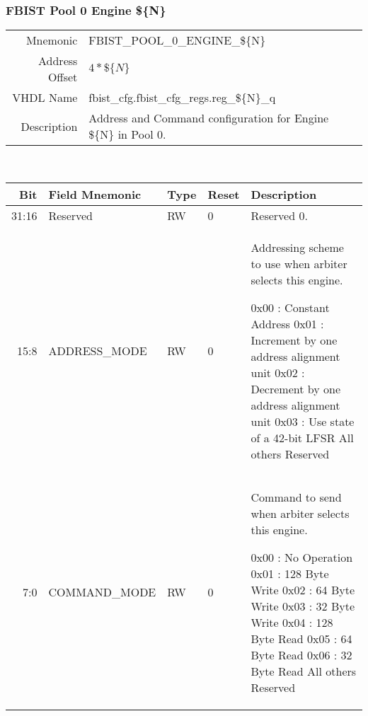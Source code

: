\subsubsection{FBIST Pool 0 Engine \$\{N\}}
\begin{tabular}{ r | p{350px} }
  Mnemonic       & FBIST\_POOL\_0\_ENGINE\_\$\{N\}             \\
  Address Offset & $4 * \$\{N\}$                               \\
  VHDL Name      & fbist\_cfg.fbist\_cfg\_regs.reg\_\$\{N\}\_q \\ \hline

  Description &
  Address and Command configuration for Engine \$\{N\} in Pool 0. \\
\end{tabular}
\\
\begin{tabularx}{\textwidth}{r|l|l|l|X}
  \hline
  Bit   & Field Mnemonic & Type & Reset & Description \\ \hline

  31:16 & Reserved       & RW   & 0     &

  Reserved 0. \\

  15:8  & ADDRESS\_MODE  & RW   & 0     &

  Addressing scheme to use when arbiter selects this engine.

  \setlength\parindent{24pt}
  \indent 0x00 : Constant Address                        \newline
  \indent 0x01 : Increment by one address alignment unit \newline
  \indent 0x02 : Decrement by one address alignment unit \newline
  \indent 0x03 : Use state of a 42-bit LFSR              \newline
  \indent All others Reserved                            \\

  7:0   & COMMAND\_MODE  & RW   & 0     &

  Command to send when arbiter selects this engine.

  \setlength\parindent{24pt}
  \indent 0x00 : No Operation   \newline
  \indent 0x01 : 128 Byte Write \newline
  \indent 0x02 : 64 Byte Write  \newline
  \indent 0x03 : 32 Byte Write  \newline
  \indent 0x04 : 128 Byte Read  \newline
  \indent 0x05 : 64 Byte Read   \newline
  \indent 0x06 : 32 Byte Read   \newline
  \indent All others Reserved   \\
\end{tabularx}

